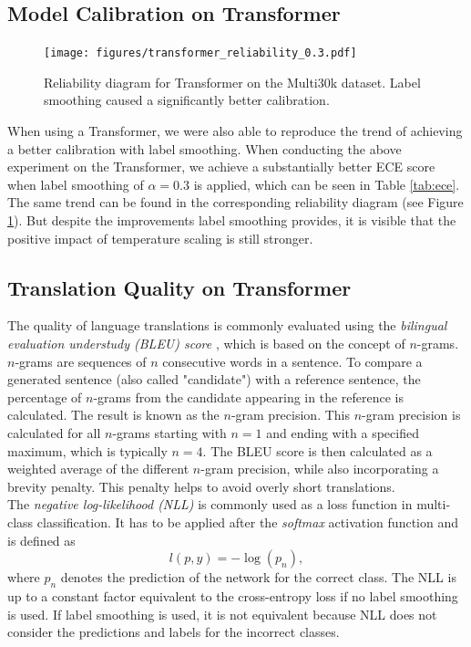 \subsection{Model Calibration on Transformer}
\begin{figure}\vspace{-1.1cm}
    \texttt{[image: figures/transformer\_reliability\_0.3.pdf]}
    \caption{Reliability diagram for Transformer on the Multi30k dataset. Label smoothing caused a significantly better calibration.}
    \vspace{-1cm}
    \label{fig:acc_conf_transformer}
\end{figure}
When using a Transformer, we were also able to reproduce the trend of achieving a better calibration with label smoothing. When conducting the above experiment on the Transformer, we achieve a substantially better ECE score when label smoothing of $\alpha = 0.3$ is applied, which can be seen in Table \ref{tab:ece}. The same trend can be found in the corresponding reliability diagram (see Figure \ref{fig:acc_conf_transformer}). But despite the improvements label smoothing provides, it is visible that the positive impact of temperature scaling is still stronger.

\subsection{Translation Quality on Transformer}
The quality of language translations is commonly evaluated using the \textit{bilingual evaluation understudy (BLEU) score} \cite{papineni2002}, which is based on the concept of $n$-grams. $n$-grams are sequences of $n$ consecutive words in a sentence. To compare a generated sentence (also called "candidate") with a reference sentence, the percentage of $n$-grams from the candidate appearing in the reference is calculated. The result is known as the $n$-gram precision. This $n$-gram precision is calculated for all $n$-grams starting with $n = 1$ and ending with a specified maximum, which is typically $n = 4$. The BLEU score is then calculated as a weighted average of the different $n$-gram precision, while also incorporating a brevity penalty. This penalty helps to avoid overly short translations.\\

The \textit{negative log-likelihood (NLL)} is commonly used as a loss function in multi-class classification. It has to be applied after the \textit{softmax} activation function and is defined as
$$l(p, y) = -\log(p_n),$$
where $p_n$ denotes the prediction of the network for the correct class.
The NLL is up to a constant factor equivalent to the cross-entropy loss if no label smoothing is used. If label smoothing is used, it is not equivalent because NLL does not consider the predictions and labels for the incorrect classes.\\

